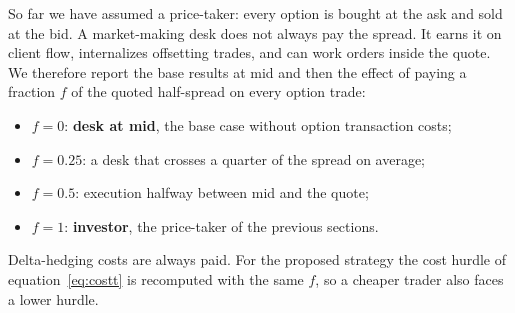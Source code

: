 So far we have assumed a price-taker: every option is bought at the ask and sold at the bid. A market-making desk does not always pay the spread. It earns it on client flow, internalizes offsetting trades, and can work orders inside the quote. We therefore report the base results at mid and then the effect of paying a fraction $f$ of the quoted half-spread on every option trade:
\begin{itemize}
  \item $f = 0$: \textbf{desk at mid}, the base case without option transaction costs;
  \item $f = 0.25$: a desk that crosses a quarter of the spread on average;
  \item $f = 0.5$: execution halfway between mid and the quote;
  \item $f = 1$: \textbf{investor}, the price-taker of the previous sections.
\end{itemize}
Delta-hedging costs are always paid. For the proposed strategy the cost hurdle of equation~\eqref{eq:costt} is recomputed with the same $f$, so a cheaper trader also faces a lower hurdle.

